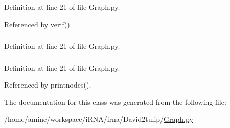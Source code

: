 \-Definition at line 21 of file \-Graph.\-py.



\-Referenced by verif().

\hypertarget{classirna_1_1David2tulip_1_1Graph_1_1Graph_ad29059e4f3b11c5f723a631168255cc6}{
\subsubsection[{goregex}]{}}
\label{classirna_1_1David2tulip_1_1Graph_1_1Graph_ad29059e4f3b11c5f723a631168255cc6}


\-Definition at line 21 of file \-Graph.\-py.

\hypertarget{classirna_1_1David2tulip_1_1Graph_1_1Graph_a4075e68c0e02ec82a3178e35eba24c86}{
\subsubsection[{node\-\_\-objects}]{}}
\label{classirna_1_1David2tulip_1_1Graph_1_1Graph_a4075e68c0e02ec82a3178e35eba24c86}


\-Definition at line 21 of file \-Graph.\-py.



\-Referenced by printnodes().



\-The documentation for this class was generated from the following file\-:\begin{DoxyCompactItemize}
\item 
/home/amine/workspace/i\-R\-N\-A/irna/\-David2tulip/\hyperlink{Graph_8py}{\-Graph.\-py}\end{DoxyCompactItemize}
